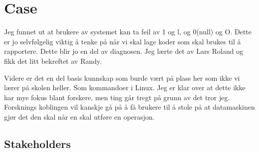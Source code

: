 \chapter{Case}
Jeg funnet ut at brukere av systemet kan ta feil av 1 og l, og 0(null) og O. Dette er jo selvfølgelig viktig å tenke på når vi skal lage koder som skal brukes til å rapportere.
Dette blir jo en del av diagnosen. Jeg lærte det av Lars Roland og fikk det litt bekreftet av Randy.

Videre er det en del basis kunnskap som burde vært på plass her som ikke vi lærer på skolen heller. Som kommandoer i Linux. Jeg er klar over at dette ikke har mye fokus blant forskere, men ting går tregt på grunn av det tror jeg.
Forsknings koblingen vil kanskje gå på å få brukere til å stole på at datamaskinen gjør det den skal når en skal utføre en operasjon.
\section{Stakeholders}